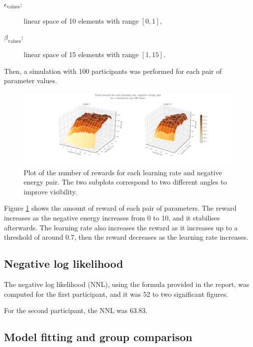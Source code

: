 \documentclass[12pt]{article}
\begin{document}
\begin{description}
\item[$\epsilon_{\mathrm{values}}$:] linear space of 10 elements with range $[0, 1]$, 
\item[$\beta_{\mathrm{values}}$:] linear space of 15 elements with range $[1, 15]$.
\end{description}

Then, a simulation with 100 participants was performed for each pair of parameter values. 

\begin{figure}[h!]
	\centering
	\hspace*{-2.2in}
	\includegraphics[width=1.5\linewidth]{figures/2.3.pdf}
	\caption{Plot of the number of rewards for each learning rate and negative energy pair. The two subplots correspond to two different angles to improve visibility.}
	\label{fig:2.3}
\end{figure}

Figure \ref{fig:2.3} shows the amount of reward of each pair of parameters. The reward increases as the negative energy increases from 0 to 10, and it stabilises afterwards. The learning rate also increases the reward as it increases up to a threshold of around 0.7, then the reward decreases as the learning rate increases.

\subsection{Negative log likelihood}

The negative log likelihood (NNL), using the formula provided in the report, was computed for the first participant, and it was 52 to two significant figures. 

For the second participant, the NNL was 63.83.

\subsection{Model fitting and group comparison}
\end{document}

